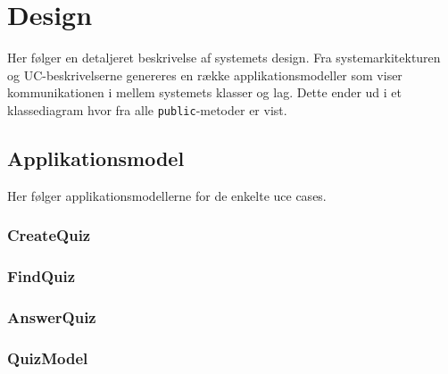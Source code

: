 \chapter{Design}
Her følger en detaljeret beskrivelse af systemets design. Fra systemarkitekturen og UC-beskrivelserne genereres en række applikationsmodeller som viser kommunikationen i mellem systemets klasser og lag. Dette ender ud i et klassediagram hvor fra alle \verb+public+-metoder er vist.

\section{Applikationsmodel}
Her følger applikationsmodellerne for de enkelte uce cases.

\subsection{CreateQuiz}



\subsection{FindQuiz}




\subsection{AnswerQuiz}




\subsection{QuizModel}

